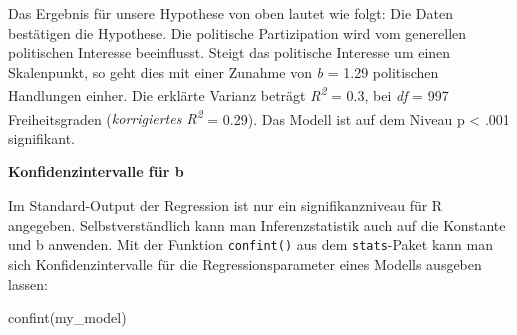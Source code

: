 \documentclass[
]{book}
\newenvironment{Shaded}{\begin{snugshade}}{\end{snugshade}}
\newcommand{\ConstantTok}[1]{\textcolor[rgb]{0.00,0.00,0.00}{#1}}
\newcommand{\DecValTok}[1]{\textcolor[rgb]{0.00,0.00,0.81}{#1}}
\newcommand{\FloatTok}[1]{\textcolor[rgb]{0.00,0.00,0.81}{#1}}
\newcommand{\FunctionTok}[1]{\textcolor[rgb]{0.00,0.00,0.00}{#1}}
\newcommand{\NormalTok}[1]{#1}
\newcommand{\OtherTok}[1]{\textcolor[rgb]{0.56,0.35,0.01}{#1}}
\newcommand{\SpecialCharTok}[1]{\textcolor[rgb]{0.00,0.00,0.00}{#1}}
\newcommand{\StringTok}[1]{\textcolor[rgb]{0.31,0.60,0.02}{#1}}
\begin{document}
\begin{Shaded}
\end{Shaded}

Das Ergebnis für unsere Hypothese von oben lautet wie folgt: Die Daten bestätigen die Hypothese. Die politische Partizipation wird vom generellen politischen Interesse beeinflusst. Steigt das politische Interesse um einen Skalenpunkt, so geht dies mit einer Zunahme von \emph{b} = 1.29 politischen Handlungen einher. Die erklärte Varianz beträgt \emph{R\textsuperscript{2}} = 0.3, bei \emph{df} = 997 Freiheitsgraden (\emph{korrigiertes R\textsuperscript{2}} = 0.29). Das Modell ist auf dem Niveau p \textless{} .001 signifikant.

\leavevmode\hypertarget{info_b_confidence}{}%
\textbf{Konfidenzintervalle für b}

Im Standard-Output der Regression ist nur ein signifikanzniveau für R angegeben. Selbstverständlich kann man Inferenzstatistik auch auf die Konstante und b anwenden. Mit der Funktion \texttt{confint()} aus dem \texttt{stats}-Paket kann man sich Konfidenzintervalle für die Regressionsparameter eines Modells ausgeben lassen:

\begin{Shaded}
\begin{Highlighting}[]
\FunctionTok{confint}\NormalTok{(my\_model)}
\end{Highlighting}
\end{Shaded}
\end{document}
